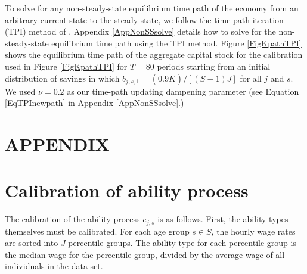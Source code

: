 \documentclass[letterpaper,12pt]{article}
\theoremstyle{definition}
\begin{document}
\begin{spacing}{1.5}
    To solve for any non-steady-state equilibrium time path of the economy from an arbitrary current state to the steady state, we follow the time path iteration (TPI) method of \citet{AuerbachKotlikoff:1987}. Appendix \ref{AppNonSSsolve} details how to solve for the non-steady-state equilibrium time path using the TPI method. Figure \ref{FigKpathTPI} shows the equilibrium time path of the aggregate capital stock for the calibration used in Figure \ref{FigKpathTPI} for $T=80$ periods starting from an initial distribution of savings in which $b_{j,s,1}=(0.9\bar{K})/[(S-1)J]$ for all $j$ and $s$. We used $\nu=0.2$ as our time-path updating dampening parameter (see Equation \eqref{EqTPInewpath} in Appendix \ref{AppNonSSsolve}.)


\clearpage

\end{spacing}

\newpage
\renewcommand{\theequation}{A.\arabic{section}.\arabic{equation}}
\renewcommand{\thesection}{A-\arabic{section}}   %
\setcounter{equation}{0}                         %
\setcounter{section}{0}                          %
\section*{APPENDIX}                              %

\section{Calibration of ability process}\label{AppAbilCalib}

  The calibration of the ability process $e_{j,s}$ is as follows.  First, the ability types themselves must be calibrated. For each age group $s \in S$, the hourly wage rates are sorted into $J$ percentile groups.  The ability type for each percentile group is the median wage for the percentile group, divided by the average wage of all individuals in the data set.
\end{document}
